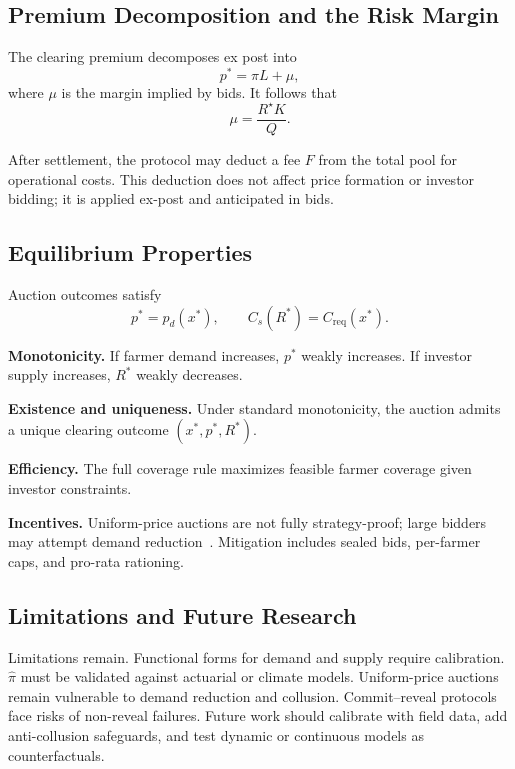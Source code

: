 \documentclass[11pt,a4paper]{article}
\begin{document}
        \subsection{Premium Decomposition and the Risk Margin}\label{subsec:premium-decomposition}
        The clearing premium decomposes ex post into
        \[
            p^\ast = \hat{\pi}L + \mu,
        \]
        where $\mu$ is the margin implied by bids.
        It follows that
        \[
            \mu = \frac{R^\star K}{Q}.
        \]

        After settlement, the protocol may deduct a fee $F$ from the total pool for operational costs.
        This deduction does not affect price formation or investor bidding; it is applied ex-post and anticipated in bids.

        \subsection{Equilibrium Properties}\label{subsec:equilibrium-properties}
        Auction outcomes satisfy
        \[
            p^\ast = p_d(x^\ast), \qquad C_s(R^\ast) = C_{\mathrm{req}}(x^\ast).
        \]

        \textbf{Monotonicity.} If farmer demand increases, $p^\ast$ weakly increases. If investor supply increases, $R^\ast$ weakly decreases.

        \textbf{Existence and uniqueness.} Under standard monotonicity, the auction admits a unique clearing outcome $(x^\ast,p^\ast,R^\ast)$.

        \textbf{Efficiency.} The full coverage rule maximizes feasible farmer coverage given investor constraints.

        \textbf{Incentives.} Uniform-price auctions are not fully strategy-proof; large bidders may attempt demand reduction~\parencite{ausubel2002demand}. Mitigation includes sealed bids, per-farmer caps, and pro-rata rationing.

        \subsection{Limitations and Future Research}\label{subsec:limitations-and-future-research}
        Limitations remain. Functional forms for demand and supply require calibration. $\hat{\pi}$ must be validated against actuarial or climate models.
        Uniform-price auctions remain vulnerable to demand reduction and collusion.
        Commit--reveal protocols face risks of non-reveal failures.
        Future work should calibrate with field data, add anti-collusion safeguards, and test dynamic or continuous models as counterfactuals.
\end{document}

